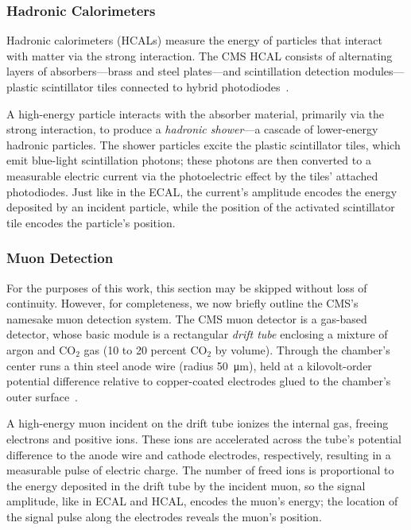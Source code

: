 \documentclass[11pt, a4paper]{article}
\newcommand{\chem}[1]{\ensuremath{\mathrm{#1}}}  %
\begin{document}
\subsubsection{Hadronic Calorimeters}
Hadronic calorimeters (HCALs) measure the energy of particles that interact with matter via the strong interaction.
The CMS HCAL consists of alternating layers of absorbers---brass and steel plates---and scintillation detection modules---plastic scintillator tiles connected to hybrid photodiodes~\cite{hcal-tdr}.

A high-energy particle interacts with the absorber material, primarily via the strong interaction, to produce a \textit{hadronic shower}---a cascade of lower-energy hadronic particles.
The shower particles excite the plastic scintillator tiles, which emit blue-light scintillation photons; these photons are then converted to a measurable electric current via the photoelectric effect by the tiles' attached photodiodes.
Just like in the ECAL, the current's amplitude encodes the energy deposited by an incident particle, while the position of the activated scintillator tile encodes the particle's position.

\subsubsection{Muon Detection}
For the purposes of this work, this section may be skipped without loss of continuity.
However, for completeness, we now briefly outline the CMS's namesake muon detection system.
The CMS muon detector is a gas-based detector, whose basic module is a rectangular \textit{drift tube} enclosing a mixture of argon and \chem{CO_2} gas (10 to 20 percent \chem{CO_2} by volume).
Through the chamber's center runs a thin steel anode wire (radius \SI{50}{\micro \meter}), held at a kilovolt-order potential difference relative to copper-coated electrodes glued to the chamber's outer surface~\cite{muon-tdr}.

A high-energy muon incident on the drift tube ionizes the internal gas, freeing electrons and positive ions.
These ions are accelerated across the tube's potential difference to the anode wire and cathode electrodes, respectively, resulting in a measurable pulse of electric charge.
The number of freed ions is proportional to the energy deposited in the drift tube by the incident muon, so the signal amplitude, like in ECAL and HCAL, encodes the muon's energy; the location of the signal pulse along the electrodes reveals the muon's position.
\end{document}
